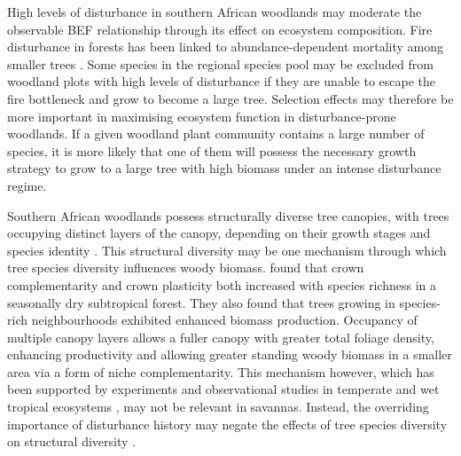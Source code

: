 \documentclass[11pt,a4paper]{article}
\begin{document}
High levels of disturbance in southern African woodlands may moderate the observable BEF relationship through its effect on ecosystem composition. Fire disturbance in forests has been linked to abundance-dependent mortality among smaller trees \citep{Roques2001, Staver2009, Bond2005}. Some species in the regional species pool may be excluded from woodland plots with high levels of disturbance if they are unable to escape the fire bottleneck and grow to become a large tree. Selection effects may therefore be more important in maximising ecosystem function in disturbance-prone woodlands. If a given woodland plant community contains a large number of species, it is more likely that one of them will possess the necessary growth strategy to grow to a large tree with high biomass under an intense disturbance regime. 

Southern African woodlands possess structurally diverse tree canopies, with trees occupying distinct layers of the canopy, depending on their growth stages and species identity \citep{Solbrig1996}. This structural diversity may be one mechanism through which tree species diversity influences woody biomass. \citet{Kunz2019} found that crown complementarity and crown plasticity both increased with species richness in a seasonally dry subtropical forest. They also found that trees growing in species-rich neighbourhoods exhibited enhanced biomass production. Occupancy of multiple canopy layers allows a fuller canopy with  greater total foliage density, enhancing productivity and allowing greater standing woody biomass in a smaller area via a form of niche complementarity. This mechanism however, which has been supported by experiments and observational studies in temperate and wet tropical ecosystems \citep{Hardiman2011, Stark2012}, may not be relevant in savannas. Instead, the overriding importance of disturbance history may negate the effects of tree species diversity on structural diversity \citep{Grime2012}.
\end{document}
